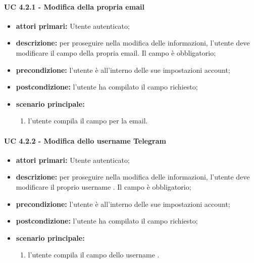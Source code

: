 				\paragraph{UC 4.2.1 - Modifica della propria email}
				\begin{itemize}
					\item \textbf{attori primari:} Utente autenticato;
					\item \textbf{descrizione:} per proseguire nella modifica delle informazioni, l'utente deve modificare il campo della propria email. Il campo è obbligatorio;
					\item \textbf{precondizione:} l'utente è all'interno delle sue impostazioni account;
					\item \textbf{postcondizione:} l'utente ha compilato il campo richiesto;
					\item \textbf{scenario principale:}
					\begin{enumerate}
						\item l'utente compila il campo per la email.
					\end{enumerate}
				\end{itemize}

				\paragraph{UC 4.2.2 - Modifica dello username Telegram}
				\begin{itemize}
					\item \textbf{attori primari:} Utente autenticato;
					\item \textbf{descrizione:} per proseguire nella modifica delle informazioni, l'utente deve modificare il proprio username . Il campo è obbligatorio;
					\item \textbf{precondizione:} l'utente è all'interno delle sue impostazioni account;
					\item \textbf{postcondizione:} l'utente ha compilato il campo richiesto;
					\item \textbf{scenario principale:}
					\begin{enumerate}
						\item l'utente compila il campo dello username .
					\end{enumerate}
				\end{itemize}

